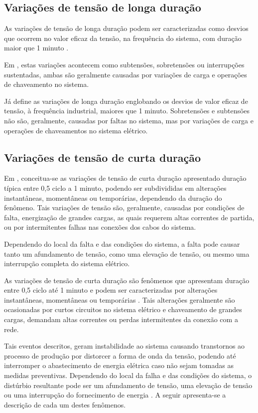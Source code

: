 \subsection{Variações de tensão de longa duração}
\par
As variações de tensão de longa duração podem ser caracterizadas como desvios que ocorrem no valor eficaz da tensão, na frequência do sistema, com duração maior que 1 minuto \cite{DUG96}.
\par 
Em \cite{DEL03}, estas variações acontecem como subtensões, sobretensões ou interrupções sustentadas, ambas são geralmente causadas por variações de carga e operações de chaveamento no sistema.
\par 
Já \cite{FER99} define as variações de longa duração englobando os desvios de valor eficaz de tensão, à frequência industrial, maiores que 1 minuto. Sobretensões e subtensões não são, geralmente, causadas por faltas no sistema, mas por variações de carga e operações de chaveamentos no sistema elétrico.

\subsection{Variações de tensão de curta duração}
\par 
Em \cite{DUG96}, conceitua-se as variações de tensão de curta duração apresentado duração típica entre 0,5 ciclo a 1 minuto, podendo ser subdivididas em alterações instantâneas, momentâneas ou temporárias, dependendo da duração do fenômeno. Tais variações de tensão são, geralmente, causadas por condições de falta, energização de grandes cargas, as quais requerem altas correntes de partida, ou por intermitentes falhas nas conexões dos cabos do sistema. 
\par 
Dependendo do local da falta e das condições do sistema, a falta pode causar tanto um afundamento de tensão, como uma elevação de tensão, ou mesmo uma interrupção completa do sistema elétrico.
\par 
As variações de tensão de curta duração são fenômenos que apresentam duração entre 0,5 ciclo até 1 minuto e podem ser caracterizadas por alterações instantâneas, momentâneas ou temporárias \cite{JUN09}. Tais alterações geralmente são ocasionadas por curtos circuitos no sistema elétrico e chaveamento de grandes cargas, demandam altas correntes ou perdas intermitentes da conexão com a rede. 
\par 
Tais eventos descritos, geram instabilidade ao sistema causando transtornos ao processo de produção por distorcer a forma de onda da tensão, podendo até interromper o abastecimento de energia elétrica caso não sejam tomadas as medidas preventivas. Dependendo do local da falha e das condições do sistema, o distúrbio resultante pode ser um afundamento de tensão, uma elevação de tensão ou uma interrupção do fornecimento de energia \cite{IEE95}. A seguir apresenta-se a descrição de cada um destes fenômenos.

